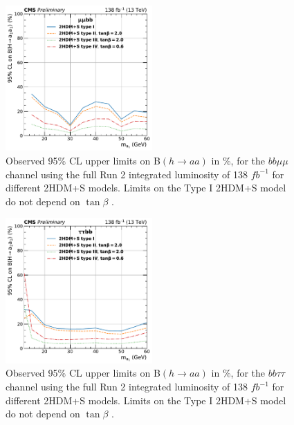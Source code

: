 \begin{figure}[ht]
    \begin{center}
      \includegraphics[width=0.5\textwidth]{figures/ch-13-results/HAA_bbmm_all_prelim.pdf}
    \end{center}
    \caption[Observed 95\% CL upper limits on B$(h \rightarrow aa)$ in \%, for the $bb\mu\mu$ channel using the full Run 2 integrated luminosity of 138 $fb^{-1}$ for different 2HDM+S models.]{Observed 95\% CL upper limits on B$(h \rightarrow aa)$ in \%, for the $bb\mu\mu$ channel using the full Run 2 integrated luminosity of 138 $fb^{-1}$ for different 2HDM+S models. Limits on the Type I 2HDM+S model do not depend on $\tan\beta$ \cite{CMS-AN-20-213}.}
      \label{fig:results_limits_mmbb}
  \end{figure}
  \begin{figure}[h!]
    \begin{center}
      \includegraphics[width=0.5\textwidth]{figures/ch-13-results/HAA_bbtt_all_prelim.pdf}
    \end{center}
    \caption[Observed 95\% CL upper limits on B$(h \rightarrow aa)$ in \%, for the $bb\tau\tau$ channel using the full Run 2 integrated luminosity of 138 $fb^{-1}$ for different 2HDM+S models.]{Observed 95\% CL upper limits on B$(h \rightarrow aa)$ in \%, for the $bb\tau\tau$ channel using the full Run 2 integrated luminosity of 138 $fb^{-1}$ for different 2HDM+S models. Limits on the Type I 2HDM+S model do not depend on $\tan\beta$ \cite{CMS-AN-20-213}.}
      \label{fig:results_limits_ttbb}
  \end{figure}
